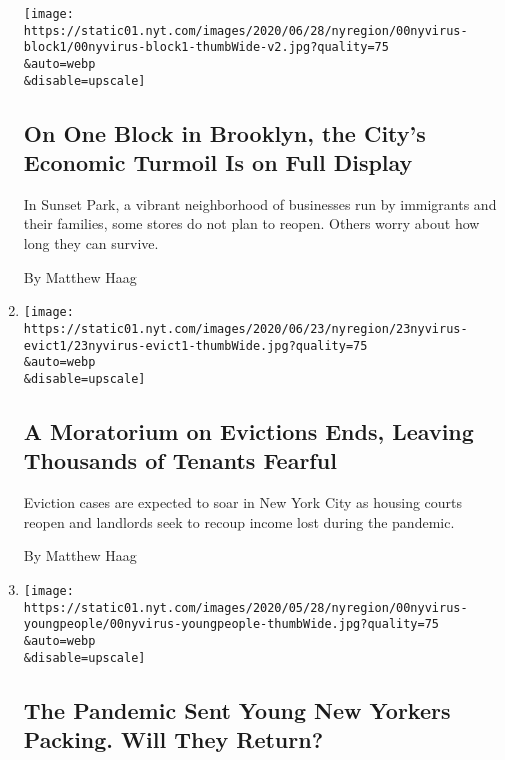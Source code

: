 \begin{enumerate}
  \texttt{[image: https://static01.nyt.com/images/2020/06/28/nyregion/00nyvirus-block1/00nyvirus-block1-thumbWide-v2.jpg?quality=75\\\&auto=webp\\\&disable=upscale]}

  \hypertarget{on-one-block-in-brooklyn-the-citys-economic-turmoil-is-on-full-display}{%
  \subsection{On One Block in Brooklyn, the City's Economic Turmoil Is
  on Full
  Display}\label{on-one-block-in-brooklyn-the-citys-economic-turmoil-is-on-full-display}}

  In Sunset Park, a vibrant neighborhood of businesses run by immigrants
  and their families, some stores do not plan to reopen. Others worry
  about how long they can survive.

  By Matthew Haag
\item
  \href{/2020/06/22/nyregion/nyc-evictions-moratorium-coronavirus.html}{}

  \texttt{[image: https://static01.nyt.com/images/2020/06/23/nyregion/23nyvirus-evict1/23nyvirus-evict1-thumbWide.jpg?quality=75\\\&auto=webp\\\&disable=upscale]}

  \hypertarget{a-moratorium-on-evictions-ends-leaving-thousands-of-tenants-fearful}{%
  \subsection{A Moratorium on Evictions Ends, Leaving Thousands of
  Tenants
  Fearful}\label{a-moratorium-on-evictions-ends-leaving-thousands-of-tenants-fearful}}

  Eviction cases are expected to soar in New York City as housing courts
  reopen and landlords seek to recoup income lost during the pandemic.

  By Matthew Haag
\item
  \href{/2020/06/19/nyregion/nyc-coronavirus-young-people.html}{}

  \texttt{[image: https://static01.nyt.com/images/2020/05/28/nyregion/00nyvirus-youngpeople/00nyvirus-youngpeople-thumbWide.jpg?quality=75\\\&auto=webp\\\&disable=upscale]}

  \hypertarget{the-pandemic-sent-young-new-yorkers-packing-will-they-return}{%
  \subsection{The Pandemic Sent Young New Yorkers Packing. Will They
  Return?}\label{the-pandemic-sent-young-new-yorkers-packing-will-they-return}}


\end{enumerate}

